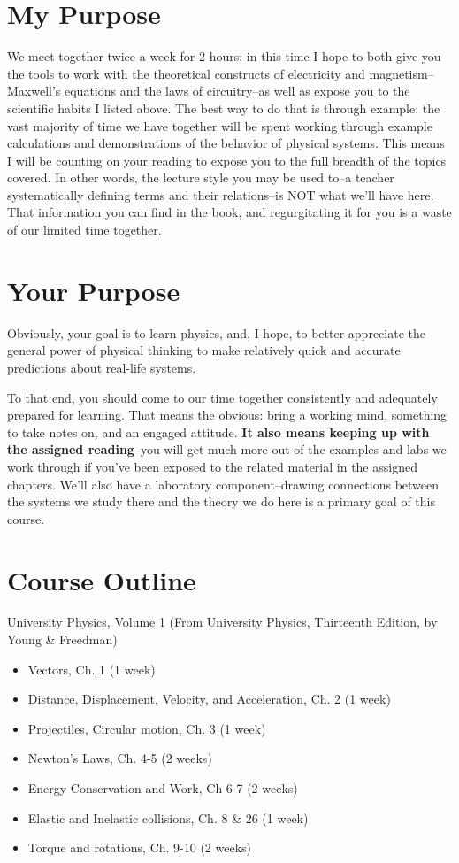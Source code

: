 \documentclass[12pt]{article}
\begin{document}
\section*{My Purpose}
We meet together twice a week for 2 hours; in this time I hope to both give you the tools to work with the theoretical constructs of electricity and magnetism--Maxwell's equations and the laws of circuitry--as well as expose you to the scientific habits I listed above. The best way to do that is through example: the vast majority of time we have together will be spent working through example calculations and demonstrations of the behavior of physical systems. This means I will be counting on your reading to expose you to the full breadth of the topics covered.  In other words, the lecture style you may be used to--a teacher systematically defining terms and their relations--is NOT what we'll have here.  That information you can find in the book, and regurgitating it for you is a waste of our limited time together.

\section*{Your Purpose}
Obviously, your goal is to learn physics, and, I hope, to better appreciate the general power of physical thinking to make relatively quick and accurate predictions about real-life systems. 
\medskip

\noindent To that end, you should come to our time together consistently and adequately prepared for learning. That means the obvious: bring a working mind, something to take notes on, and an engaged attitude. {\bf It also means keeping up with the assigned reading}--you will get much more out of the examples and labs we work through if you've been exposed to the related material in the assigned chapters. We'll also have a laboratory component--drawing connections between the systems we study there and the theory we do here is a primary goal of this course. 

\section*{Course Outline}

 University Physics, Volume 1 (From University Physics, Thirteenth Edition, by Young \& Freedman)
\medskip
\begin{itemize}
\item{Vectors, Ch. 1 (1 week)}
\item{Distance, Displacement, Velocity, and Acceleration, Ch. 2  (1 week)}
\item{Projectiles, Circular motion, Ch. 3 (1 week)}
\item{Newton's Laws, Ch. 4-5 (2 weeks)}
\item{Energy Conservation and Work, Ch 6-7 (2 weeks)}
\item{Elastic and Inelastic collisions, Ch. 8 \& 26 (1 week)}
\item{Torque and rotations, Ch. 9-10 (2 weeks)}

\end{itemize}
\end{document}
